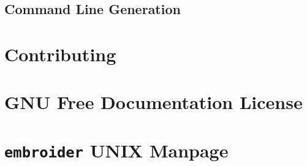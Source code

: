 \documentclass[a4paper,11pt]{article}
\begin{document}
\subsection{Command Line Generation}

\section{Contributing}

\appendix

\section{GNU Free Documentation License}

\section{\texttt{embroider} UNIX Manpage}

\printindex
\end{document}
